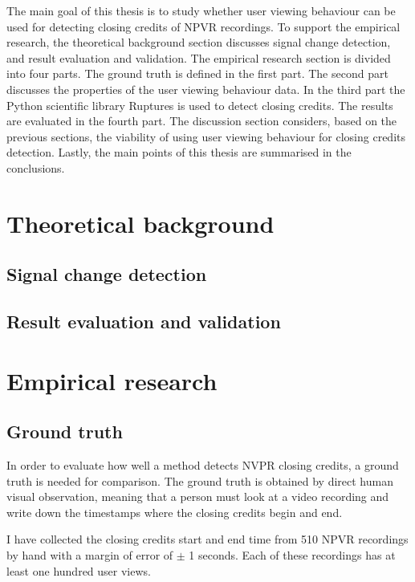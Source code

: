 The main goal of this thesis is to study whether user viewing behaviour can be used for detecting closing credits of NPVR recordings. To support the empirical research, the theoretical background section discusses signal change detection, and result evaluation and validation. The empirical research section is divided into four parts. The ground truth is defined in the first part. The second part discusses the properties of the user viewing behaviour data. In the third part the Python scientific library Ruptures is used to detect closing credits. The results are evaluated in the fourth part. The discussion section considers, based on the previous sections, the viability of using user viewing behaviour for closing credits detection. Lastly, the main points of this thesis are summarised in the conclusions.

\section{Theoretical background} \label{sec:background}

\subsection{Signal change detection} \label{subsec:methods}

\subsection{Result evaluation and validation} \label{subsec:validation}

\section{Empirical research} \label{sec:casestudy}

\subsection{Ground truth} \label{subsec:groundtruth}

In order to evaluate how well a method detects NVPR closing credits, a ground truth is needed for comparison. The ground truth is obtained by direct human visual observation, meaning that a person must look at a video recording and write down the timestamps where the closing credits begin and end.

I have collected the closing credits start and end time from 510 NPVR recordings by hand with a margin of error of $\pm$ 1 seconds. Each of these recordings has at least one hundred user views.

